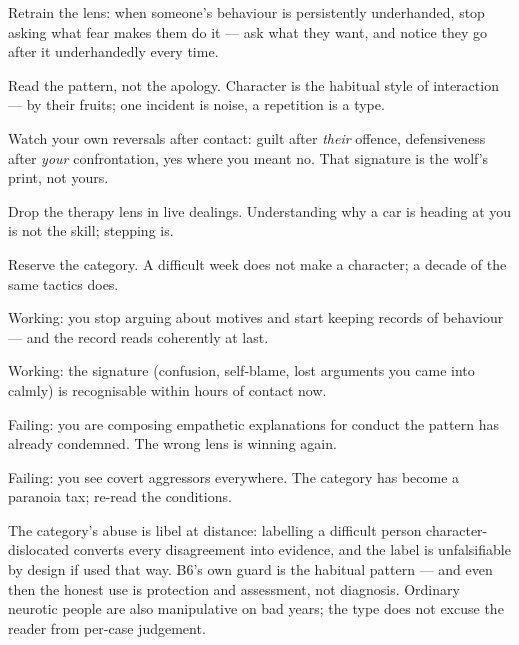\begin{application}
  \item Retrain the lens: when someone's behaviour is persistently underhanded, stop asking what fear makes them do it --- ask what they want, and notice they go after it underhandedly every time.
  \item Read the pattern, not the apology. Character is the habitual style of interaction --- by their fruits; one incident is noise, a repetition is a type.
  \item Watch your own reversals after contact: guilt after \emph{their} offence, defensiveness after \emph{your} confrontation, yes where you meant no. That signature is the wolf's print, not yours.
  \item Drop the therapy lens in live dealings. Understanding why a car is heading at you is not the skill; stepping is.
  \item Reserve the category. A difficult week does not make a character; a decade of the same tactics does.
\end{application}
\begin{feedback}
  \item Working: you stop arguing about motives and start keeping records of behaviour --- and the record reads coherently at last.
  \item Working: the signature (confusion, self-blame, lost arguments you came into calmly) is recognisable within hours of contact now.
  \item Failing: you are composing empathetic explanations for conduct the pattern has already condemned. The wrong lens is winning again.
  \item Failing: you see covert aggressors everywhere. The category has become a paranoia tax; re-read the conditions.
\end{feedback}
\begin{failure}
The category's abuse is libel at distance: labelling a difficult person character-dislocated converts every disagreement into evidence, and the label is unfalsifiable by design if used that way. B6's own guard is the habitual pattern --- and even then the honest use is protection and assessment, not diagnosis. Ordinary neurotic people are also manipulative on bad years; the type does not excuse the reader from per-case judgement.
\end{failure}
